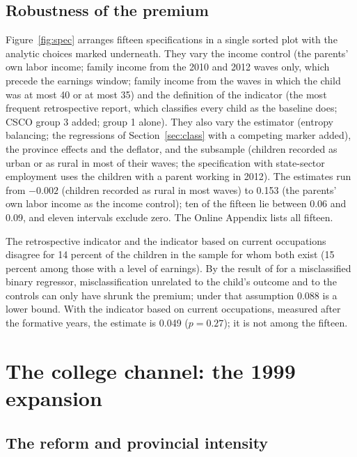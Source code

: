 \documentclass[11pt]{article}
\begin{document}
\subsection{Robustness of the premium}
\label{sec:premrobust}

Figure~\ref{fig:spec} arranges fifteen specifications in a single
sorted plot with the analytic choices marked underneath. They vary the income control (the parents' own labor income; family income from the 2010 and 2012 waves only, which precede the earnings window; family income from the waves in which the child was at most 40 or at most 35) and the definition of the indicator (the most frequent retrospective report, which classifies every child as the baseline does; CSCO group 3 added; group 1 alone). They also vary the estimator (entropy balancing; the regressions of Section~\ref{sec:class} with a competing marker added), the province effects and the deflator, and the subsample (children recorded as urban or as rural in most of their waves; the specification with state-sector employment uses the children with a parent working in 2012). The estimates run
from $-0.002$ (children recorded as rural in most waves) to 0.153 (the
parents' own labor income as the income control); ten of the fifteen lie between 0.06 and 0.09, and eleven intervals exclude zero. The Online Appendix lists all fifteen.

The retrospective indicator and the indicator based on current
occupations disagree for 14 percent of the children in the sample for whom both exist (15 percent among those with a level of earnings). By the result of \citet{Bollinger1996} for a misclassified binary
regressor, misclassification unrelated to the child's outcome and to the controls can only have shrunk the premium; under
that assumption 0.088 is a lower bound. With the indicator based on current occupations, measured after the formative years, the estimate is 0.049 ($p = 0.27$); it is not among the fifteen.

\section{The college channel: the 1999 expansion}
\label{sec:expansion}

\subsection{The reform and provincial intensity}
\label{sec:background}
\end{document}
